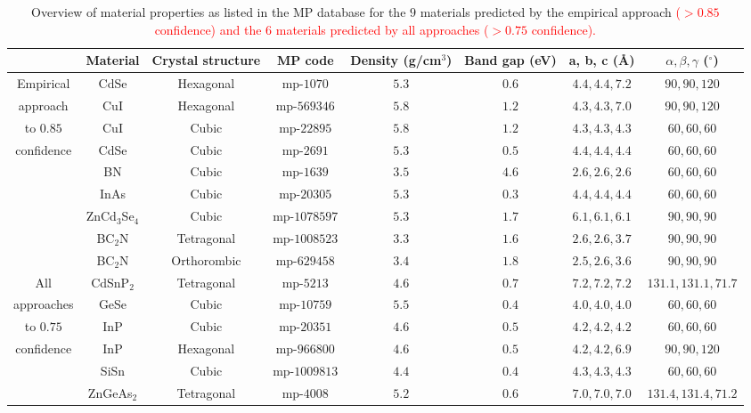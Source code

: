 \documentclass[superscriptaddress,unsortedaddress,
 amsmath,amssymb,
 aps,
]{revtex4-2}
\newcommand{\mrk}[1]{\textcolor{red}{#1}}
\begin{document}
\begin{table}[t]
    \centering 
    \caption{Overview of material properties as listed in the MP database for the $9$ materials predicted by the empirical approach \mrk{($>0.85$ confidence) and the $6$ materials predicted by all approaches ($>0.75$ confidence).} %
    }
    \begin{tabular}{c|c c c c c c c }
      & Material & Crystal structure & MP code & Density (g/cm$^3$) & Band gap (\si{\electronvolt}) & a, b, c (\AA) & $\alpha,\beta,\gamma$ ($^\circ$) \\
    \hline 
    Empirical & CdSe & Hexagonal & mp-$1070$ & $5.3$ & $0.6$ & $4.4,4.4,7.2$ & $90,90,120$ \\
    approach  & CuI & Hexagonal & mp-$569346$ & $5.8$ & $1.2$ & $4.3,4.3,7.0$ & $90,90,120$ \\ 
    to $0.85$  & CuI & Cubic & mp-$22895$ & $5.8$ & $1.2$ & $4.3,4.3,4.3$ & $60,60,60$  \\ 
    confidence & CdSe & Cubic & mp-$2691$ & $5.3$ & $0.5$ & $4.4,4.4,4.4$ & $60,60,60$  \\
     & BN & Cubic & mp-$1639$ & $3.5$ & $4.6$ & $2.6,2.6,2.6$ & $60,60,60$  \\
     & InAs & Cubic & mp-$20305$ & $5.3$ & $0.3$ & $4.4,4.4,4.4$ & $60,60,60$ \\
     & ZnCd$_3$Se$_4$ & Cubic & mp-$1078597$ & $5.3$ & $1.7$ & $6.1,6.1,6.1$ & $90,90,90$ \\
     & BC$_2$N & Tetragonal & mp-$1008523$ & $3.3$ & $1.6$ & $2.6,2.6,3.7$ & $90,90,90$ \\
     & BC$_2$N & Orthorombic & mp-$629458$ & $3.4$ & $1.8$ & $2.5,2.6,3.6$ & $90,90,90$ \\
    \hline 
    All & CdSnP$_2$ & Tetragonal & mp-$5213$ & $4.6$ & $0.7$ & $7.2,7.2,7.2$ & $131.1,131.1,71.7$ \\
    approaches & GeSe & Cubic & mp-$10759$ & $5.5$ & $0.4$ & $4.0,4.0,4.0$ & $60,60,60$ \\
    to $0.75$  & InP & Cubic & mp-$20351$ & $4.6$ & $0.5$ & $4.2,4.2,4.2$ &  $60,60,60$\\ 
    confidence & InP & Hexagonal & mp-$966800$ & $4.6$ & $0.5$ & $4.2,4.2,6.9$ & $90,90,120$ \\ 
     & SiSn & Cubic & mp-$1009813$ & $4.4$ & $0.4$ & $4.3,4.3,4.3$ & $60,60,60$ \\
     & ZnGeAs$_2$ & Tetragonal & mp-$4008$ & $5.2$ & $0.6$ & $7.0,7.0,7.0$ & $131.4,131.4,71.2$ \\
    \end{tabular}
    \label{tab:materialproperties}
\end{table}
\end{document}
